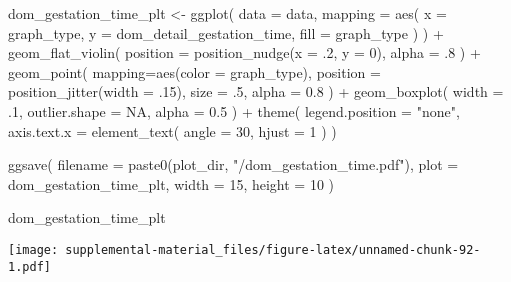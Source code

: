 \documentclass[
]{book}
\newenvironment{Shaded}{\begin{snugshade}}{\end{snugshade}}
\newcommand{\AttributeTok}[1]{\textcolor[rgb]{0.77,0.63,0.00}{#1}}
\newcommand{\ConstantTok}[1]{\textcolor[rgb]{0.00,0.00,0.00}{#1}}
\newcommand{\DecValTok}[1]{\textcolor[rgb]{0.00,0.00,0.81}{#1}}
\newcommand{\FloatTok}[1]{\textcolor[rgb]{0.00,0.00,0.81}{#1}}
\newcommand{\FunctionTok}[1]{\textcolor[rgb]{0.00,0.00,0.00}{#1}}
\newcommand{\NormalTok}[1]{#1}
\newcommand{\OtherTok}[1]{\textcolor[rgb]{0.56,0.35,0.01}{#1}}
\newcommand{\SpecialCharTok}[1]{\textcolor[rgb]{0.00,0.00,0.00}{#1}}
\newcommand{\StringTok}[1]{\textcolor[rgb]{0.31,0.60,0.02}{#1}}
\begin{document}
\begin{Shaded}
\begin{Highlighting}[]
\NormalTok{dom\_gestation\_time\_plt }\OtherTok{\textless{}{-}} \FunctionTok{ggplot}\NormalTok{(}
    \AttributeTok{data =}\NormalTok{ data,}
    \AttributeTok{mapping =} \FunctionTok{aes}\NormalTok{(}
      \AttributeTok{x =}\NormalTok{ graph\_type,}
      \AttributeTok{y =}\NormalTok{ dom\_detail\_gestation\_time,}
      \AttributeTok{fill =}\NormalTok{ graph\_type}
\NormalTok{    )}
\NormalTok{  ) }\SpecialCharTok{+}
  \FunctionTok{geom\_flat\_violin}\NormalTok{(}
    \AttributeTok{position =} \FunctionTok{position\_nudge}\NormalTok{(}\AttributeTok{x =}\NormalTok{ .}\DecValTok{2}\NormalTok{, }\AttributeTok{y =} \DecValTok{0}\NormalTok{),}
    \AttributeTok{alpha =}\NormalTok{ .}\DecValTok{8}
\NormalTok{  ) }\SpecialCharTok{+}
  \FunctionTok{geom\_point}\NormalTok{(}
    \AttributeTok{mapping=}\FunctionTok{aes}\NormalTok{(}\AttributeTok{color =}\NormalTok{ graph\_type),}
    \AttributeTok{position =} \FunctionTok{position\_jitter}\NormalTok{(}\AttributeTok{width =}\NormalTok{ .}\DecValTok{15}\NormalTok{),}
    \AttributeTok{size =}\NormalTok{ .}\DecValTok{5}\NormalTok{,}
    \AttributeTok{alpha =} \FloatTok{0.8}
\NormalTok{  ) }\SpecialCharTok{+}
  \FunctionTok{geom\_boxplot}\NormalTok{(}
    \AttributeTok{width =}\NormalTok{ .}\DecValTok{1}\NormalTok{,}
    \AttributeTok{outlier.shape =} \ConstantTok{NA}\NormalTok{,}
    \AttributeTok{alpha =} \FloatTok{0.5}
\NormalTok{  ) }\SpecialCharTok{+}
  \FunctionTok{theme}\NormalTok{(}
    \AttributeTok{legend.position =} \StringTok{"none"}\NormalTok{,}
    \AttributeTok{axis.text.x =} \FunctionTok{element\_text}\NormalTok{(}
      \AttributeTok{angle =} \DecValTok{30}\NormalTok{,}
      \AttributeTok{hjust =} \DecValTok{1}
\NormalTok{    )}
\NormalTok{  )}

\FunctionTok{ggsave}\NormalTok{(}
  \AttributeTok{filename =} \FunctionTok{paste0}\NormalTok{(plot\_dir, }\StringTok{"/dom\_gestation\_time.pdf"}\NormalTok{),}
  \AttributeTok{plot =}\NormalTok{ dom\_gestation\_time\_plt,}
  \AttributeTok{width =} \DecValTok{15}\NormalTok{,}
  \AttributeTok{height =} \DecValTok{10}
\NormalTok{)}

\NormalTok{dom\_gestation\_time\_plt}
\end{Highlighting}
\end{Shaded}

\texttt{[image: supplemental-material\_files/figure-latex/unnamed-chunk-92-1.pdf]}
\end{document}
